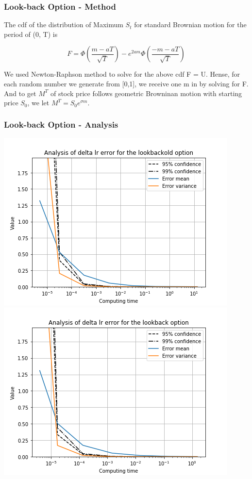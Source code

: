 \documentclass[12pt]{beamer}
\begin{document}
\begin{frame}
\frametitle{Look-back Option - Method}
The cdf of the distribution of Maximum $S_t$ for standard Brownian motion for the period of (0, T) is

$$F = \Phi(\frac{m-aT}{\sqrt{T}})-e^{2am}\Phi(\frac{-m-aT}{\sqrt{T}})$$

We used Newton-Raphson method to solve for the above cdf F = U. Hense, for each random number we generate from [0,1], we receive one m in by solving for F. And to get $M^T$ of stock price follows geometric Browninan motion with starting price $S_0$, we let $M^T=S_0e^{\sigma m }$.\\
\end{frame}

\begin{frame}
\frametitle{Look-back Option - Analysis}
\includegraphics[width=.5\textwidth]{graphs/lookbackolddeltalrtime.png}
\includegraphics[width=.5\textwidth]{graphs/lookbackdeltalrtime.png}
\end{frame}
\end{document}
